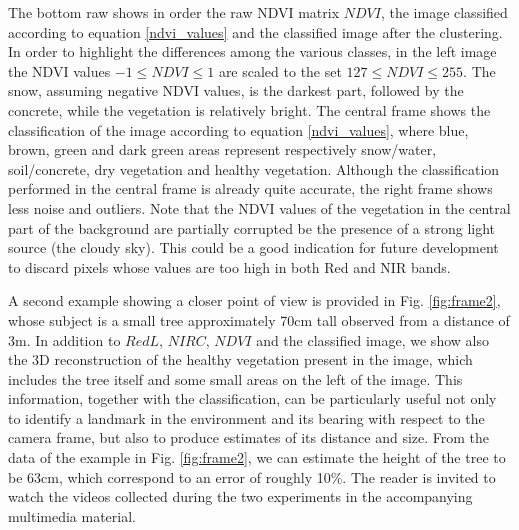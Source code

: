 \documentclass[letterpaper, 10pt, conference]{ieeeconf}      %
\begin{document}
The bottom raw shows in order the raw NDVI matrix $NDVI$, the image classified according to equation \eqref{ndvi_values} and the classified image after the clustering.
In order to highlight the differences among the various classes, in the left image the NDVI values $-1 \leq NDVI \leq 1$ are scaled to the set $127 \leq  NDVI \leq 255$.
The snow, assuming negative NDVI values, is the darkest part, followed by the concrete, while the vegetation is relatively bright.
The central frame shows the classification of the image according to equation \eqref{ndvi_values}, where blue, brown, green and dark green areas represent respectively snow/water, soil/concrete, dry vegetation and healthy vegetation.
Although the classification performed in the central frame is already quite accurate, the right frame shows less noise and outliers.
Note that the NDVI values of the vegetation in the central part of the background are partially corrupted be the presence of a strong light source (the cloudy sky).
This could be a good indication for future development to discard pixels whose values are too high in both Red and NIR bands.



A second example showing a closer point of view is provided in Fig. \ref{fig:frame2}, whose subject is a small tree approximately 70cm tall observed from a distance of 3m.
In addition to $RedL$, $NIRC$, $NDVI$ and the classified image, we show also the 3D reconstruction of the healthy vegetation present in the image, which includes the tree itself and some small areas on the left of the image.
This information, together with the classification, can be particularly useful not only to identify a landmark in the environment  and its bearing with respect to the camera frame, but also to produce  estimates of its distance and size.
From the data of the example in Fig. \ref{fig:frame2}, we can estimate the height of the tree to be 63cm, which correspond to an error of roughly 10\%.
The reader is invited to watch the videos collected during the two experiments in the accompanying multimedia material.
\end{document}
